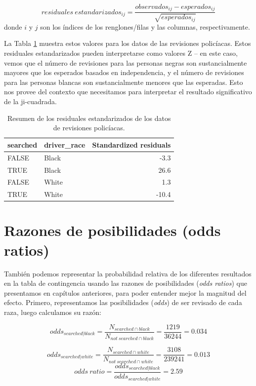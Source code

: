 \documentclass[
  12pt,
]{book}
\begin{document}
\[
residuales\ estandarizados_{ij} = \frac{observados_{ij} - esperados_{ij}}{\sqrt{esperados_{ij}}}
\]
donde \(i\) y \(j\) son los índices de los renglones/filas y las columnas, respectivamente.

La Tabla \ref{tab:stdRes} muestra estos valores para los datos de las revisiones policíacas. Estos residuales estandarizados pueden interpretarse como valores Z -- en este caso, vemos que el número de revisiones para las personas negras son sustancialmente mayores que los esperados basados en independencia, y el número de revisiones para las personas blancas son sustancialmente menores que las esperadas. Esto nos provee del contexto que necesitamos para interpretar el resultado significativo de la ji-cuadrada.

\begin{table}

\caption{\label{tab:stdRes}Resumen de los residuales estandarizados de los datos de revisiones policíacas.}
\centering
\begin{tabular}[t]{l|l|r}
\hline
searched & driver\_race & Standardized residuals\\
\hline
FALSE & Black & -3.3\\
\hline
TRUE & Black & 26.6\\
\hline
FALSE & White & 1.3\\
\hline
TRUE & White & -10.4\\
\hline
\end{tabular}
\end{table}

\hypertarget{razones-de-posibilidades-odds-ratios}{%
\section{Razones de posibilidades (odds ratios)}\label{razones-de-posibilidades-odds-ratios}}

También podemos representar la probabilidad relativa de los diferentes resultados en la tabla de contingencia usando las razones de posibilidades (\emph{odds ratios}) que presentamos en capítulos anteriores, para poder entender mejor la magnitud del efecto. Primero, representamos las posibilidades (\emph{odds}) de ser revisado de cada raza, luego calculamos su razón:

\[
odds_{searched|black} = \frac{N_{searched\cap black}}{N_{not\ searched\cap black}} = \frac{1219}{36244} = 0.034
\]

\[
odds_{searched|white} = \frac{N_{searched\cap white}}{N_{not\ searched\cap white}} = \frac{3108}{239241} = 0.013
\]
\[
odds\ ratio = \frac{odds_{searched|black}}{odds_{searched|white}} = 2.59
\]
\end{document}
